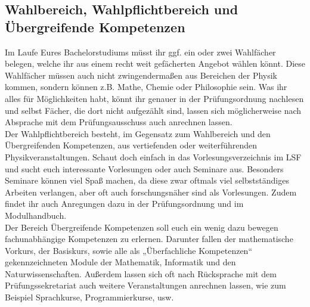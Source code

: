 
\subsection{Wahlbereich, Wahlpflichtbereich und Übergreifende Kompetenzen}

Im Laufe Eures Bachelorstudiums müsst ihr ggf. ein oder zwei Wahlfächer belegen, welche ihr aus einem recht weit gefächerten Angebot wählen könnt. Diese Wahlfächer müssen auch nicht zwingendermaßen aus Bereichen der Physik kommen, sondern können z.B. Mathe, Chemie oder Philosophie sein. Was ihr alles für Möglichkeiten habt, könnt ihr genauer in der Prüfungsordnung nachlesen und selbst Fächer, die dort nicht aufgezählt sind, lassen sich möglicherweise nach Absprache mit dem Prüfungsausschuss auch anrechnen lassen.\\

Der Wahlpflichtbereich besteht, im Gegensatz zum Wahlbereich und den Übergreifenden Kompetenzen, aus vertiefenden oder weiterführenden Physikveranstaltungen. Schaut doch einfach in das Vorlesungsverzeichnis im LSF und sucht euch interessante Vorlesungen oder auch Seminare aus. Besonders Seminare können viel Spaß machen, da diese zwar oftmals viel selbstständiges Arbeiten verlangen, aber oft auch forschungsnäher sind als Vorlesungen. Zudem findet ihr auch Anregungen dazu in der Prüfungsordnung und im Modulhandbuch.\\

Der Bereich Übergreifende Kompetenzen soll euch ein wenig dazu bewegen fachunabhängige Kompetenzen zu erlernen. Darunter fallen der mathematische Vorkurs, der Basiskurs, sowie alle als „Überfachliche Kompetenzen“ gekennzeichneten Module der Mathematik, Informatik und den Naturwissenschaften. Außerdem lassen sich oft nach Rücksprache mit dem Prüfungssekretariat auch weitere Veranstaltungen anrechnen lassen, wie zum Beispiel Sprachkurse, Programmierkurse, usw.\\


